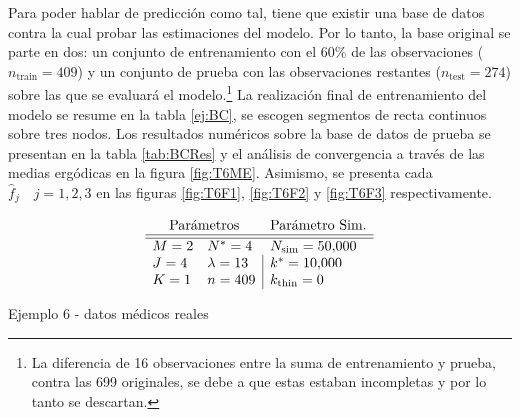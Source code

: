 \documentclass[../Main/Main.tex]{subfiles}
\begin{document}
Para poder hablar de predicción como tal, tiene que existir una base de datos contra la cual probar las estimaciones del modelo. Por lo tanto, la base original se parte en dos: un conjunto de entrenamiento con el $60\%$ de las observaciones ($n_{\text{train}} = 409$) y un conjunto de prueba con las observaciones restantes ($n_{\text{test}} = 274$) sobre las que se evaluará el modelo.\footnote{La diferencia de 16 observaciones entre la suma de entrenamiento y prueba, contra las 699 originales, se debe a que estas estaban incompletas y por lo tanto se descartan.} La realización final de entrenamiento del modelo se resume en la tabla \ref{ej:BC}, se escogen segmentos de recta continuos sobre tres nodos. Los resultados numéricos sobre la base de datos de prueba se presentan en la tabla \ref{tab:BCRes} y el análisis de convergencia a través de las medias ergódicas en la figura \ref{fig:T6ME}. Asimismo, se presenta cada $\hat{f}_j\quad j = 1,2,3$ en las figuras \ref{fig:T6F1}, \ref{fig:T6F2} y \ref{fig:T6F3} respectivamente.
\begin{table}[ht]
$$\paramsmod{2}{4}{1}{4}{13}{409}{\num{50000}}{\num{10000}}{0}$$
\caption{Ejemplo 6 - datos médicos reales}
\label{ej:BC}
\end{table}
\end{document}
